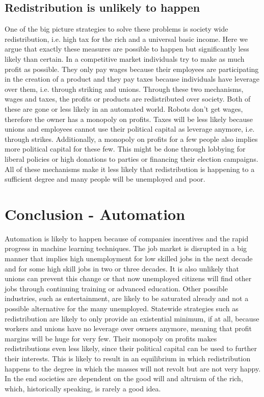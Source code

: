 \documentclass[conference]{IEEEtran}
\begin{document}
\subsection{Redistribution is unlikely to happen}

One of the big picture strategies to solve these problems is society wide redistribution, i.e. high tax for the rich and a universal basic income. Here we argue that exactly these measures are possible to happen but significantly less likely than certain. In a competitive market individuals try to make as much profit as possible. They only pay wages because their employees are participating in the creation of a product and they pay taxes because individuals have leverage over them, i.e. through striking and unions. Through these two mechanisms, wages and taxes, the profits or products are redistributed over society. Both of these are gone or less likely in an automated world. Robots don't get wages, therefore the owner has a monopoly on profits. Taxes will be less likely because unions and employees cannot use their political capital as leverage anymore, i.e. through strikes. Additionally, a monopoly on profits for a few people also implies more political capital for these few. This might be done through lobbying for liberal policies or high donations to parties or financing their election campaigns. All of these mechanisms make it less likely that redistribution is happening to a sufficient degree and many people will be unemployed and poor.

\section{Conclusion - Automation}
%
Automation is likely to happen because of companies incentives and the rapid progress in machine learning techniques. The job market is disrupted in a big manner that implies high unemployment for low skilled jobs in the next decade and for some high skill jobs in two or three decades. It is also unlikely that unions can prevent this change or that now unemployed citizens will find other jobs through continuing training or advanced education. Other possible industries, such as entertainment, are likely to be saturated already and not a possible alternative for the many unemployed. Statewide strategies such as redistribution are likely to only provide an existential minimum, if at all, because workers and unions have no leverage over owners anymore, meaning that profit margins will be huge for very few. Their monopoly on profits makes redistributions even less likely, since their political capital can be used to further their interests. This is likely to result in an equilibrium in which redistribution happens to the degree in which the masses will not revolt but are not very happy. In the end societies are dependent on the good will and altruism of the rich, which, historically speaking, is rarely a good idea.
\end{document}
